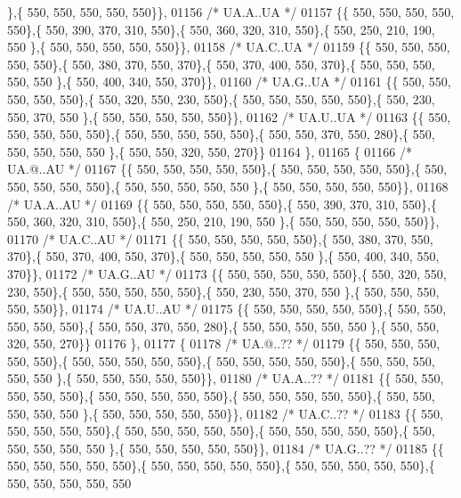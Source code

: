 \begin{DoxyCode}
      \},\{ 550, 550, 550, 550, 550\}\},
01156 \textcolor{comment}{/* UA.A..UA */}
01157 \{\{ 550, 550, 550, 550, 550\},\{ 550, 390, 370, 310, 550\},\{ 550, 360, 320, 310, 550\},\{ 550, 250, 210, 190, 550
      \},\{ 550, 550, 550, 550, 550\}\},
01158 \textcolor{comment}{/* UA.C..UA */}
01159 \{\{ 550, 550, 550, 550, 550\},\{ 550, 380, 370, 550, 370\},\{ 550, 370, 400, 550, 370\},\{ 550, 550, 550, 550, 550
      \},\{ 550, 400, 340, 550, 370\}\},
01160 \textcolor{comment}{/* UA.G..UA */}
01161 \{\{ 550, 550, 550, 550, 550\},\{ 550, 320, 550, 230, 550\},\{ 550, 550, 550, 550, 550\},\{ 550, 230, 550, 370, 550
      \},\{ 550, 550, 550, 550, 550\}\},
01162 \textcolor{comment}{/* UA.U..UA */}
01163 \{\{ 550, 550, 550, 550, 550\},\{ 550, 550, 550, 550, 550\},\{ 550, 550, 370, 550, 280\},\{ 550, 550, 550, 550, 550
      \},\{ 550, 550, 320, 550, 270\}\}
01164 \},
01165 \{
01166 \textcolor{comment}{/* UA.@..AU */}
01167 \{\{ 550, 550, 550, 550, 550\},\{ 550, 550, 550, 550, 550\},\{ 550, 550, 550, 550, 550\},\{ 550, 550, 550, 550, 550
      \},\{ 550, 550, 550, 550, 550\}\},
01168 \textcolor{comment}{/* UA.A..AU */}
01169 \{\{ 550, 550, 550, 550, 550\},\{ 550, 390, 370, 310, 550\},\{ 550, 360, 320, 310, 550\},\{ 550, 250, 210, 190, 550
      \},\{ 550, 550, 550, 550, 550\}\},
01170 \textcolor{comment}{/* UA.C..AU */}
01171 \{\{ 550, 550, 550, 550, 550\},\{ 550, 380, 370, 550, 370\},\{ 550, 370, 400, 550, 370\},\{ 550, 550, 550, 550, 550
      \},\{ 550, 400, 340, 550, 370\}\},
01172 \textcolor{comment}{/* UA.G..AU */}
01173 \{\{ 550, 550, 550, 550, 550\},\{ 550, 320, 550, 230, 550\},\{ 550, 550, 550, 550, 550\},\{ 550, 230, 550, 370, 550
      \},\{ 550, 550, 550, 550, 550\}\},
01174 \textcolor{comment}{/* UA.U..AU */}
01175 \{\{ 550, 550, 550, 550, 550\},\{ 550, 550, 550, 550, 550\},\{ 550, 550, 370, 550, 280\},\{ 550, 550, 550, 550, 550
      \},\{ 550, 550, 320, 550, 270\}\}
01176 \},
01177 \{
01178 \textcolor{comment}{/* UA.@..?? */}
01179 \{\{ 550, 550, 550, 550, 550\},\{ 550, 550, 550, 550, 550\},\{ 550, 550, 550, 550, 550\},\{ 550, 550, 550, 550, 550
      \},\{ 550, 550, 550, 550, 550\}\},
01180 \textcolor{comment}{/* UA.A..?? */}
01181 \{\{ 550, 550, 550, 550, 550\},\{ 550, 550, 550, 550, 550\},\{ 550, 550, 550, 550, 550\},\{ 550, 550, 550, 550, 550
      \},\{ 550, 550, 550, 550, 550\}\},
01182 \textcolor{comment}{/* UA.C..?? */}
01183 \{\{ 550, 550, 550, 550, 550\},\{ 550, 550, 550, 550, 550\},\{ 550, 550, 550, 550, 550\},\{ 550, 550, 550, 550, 550
      \},\{ 550, 550, 550, 550, 550\}\},
01184 \textcolor{comment}{/* UA.G..?? */}
01185 \{\{ 550, 550, 550, 550, 550\},\{ 550, 550, 550, 550, 550\},\{ 550, 550, 550, 550, 550\},\{ 550, 550, 550, 550, 550

\end{DoxyCode}
